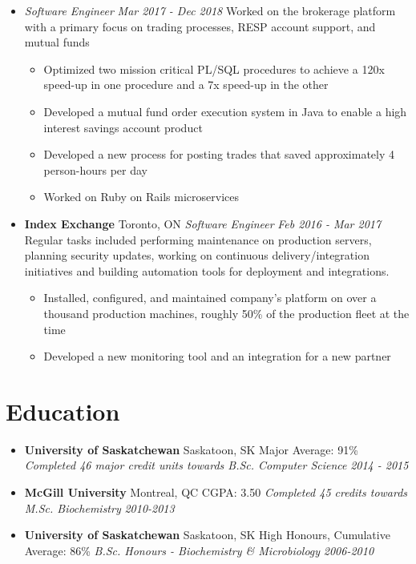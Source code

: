 \documentclass[letterpaper,11pt]{article}
\newcommand{\resumeSubHeading}[4]{
  \item[]
      \textbf{#1} \hfill #2 \newline
      \textit{#3} \hfill \textit{#4}
}
\newcommand{\jobAtSamePlace}[2]{
  \item[]
      \textit{#1} \hfill \textit{#2}
}
\newcommand{\resumeSubHeadingEducation}[5]{
  \item[]
      \textbf{#1} \hfill #2 \newline
      #3 \newline
      \textit{#4} \hfill \textit{#5}
}
\begin{document}
\begin{itemize}[leftmargin=*]
    {Engineering Team Lead}{Dec 2018 - Apr 2019}\newline
    Led a full stack team of 4 engineers in the Wealthsimple For Advisors organization
      \begin{itemize}[noitemsep,topsep=0pt]
        \item Developed new mutual fund process automation in PL/SQL and Java
      \end{itemize}
      \jobAtSamePlace
      {Software Engineer}{Mar 2017 - Dec 2018}\newline
      Worked on the brokerage platform with a primary focus on trading processes, RESP account support, and mutual funds
      \begin{itemize}[noitemsep,topsep=0pt]
        \item Optimized two mission critical PL/SQL procedures to achieve a 120x speed-up in one procedure and a 7x speed-up in the other
        \item Developed a mutual fund order execution system in Java to enable a high interest savings account product
        \item Developed a new process for posting trades that saved approximately 4 person-hours per day
        \item Worked on Ruby on Rails microservices
      \end{itemize}
      
  \resumeSubHeading
      {Index Exchange}{Toronto, ON}
      {Software Engineer}{Feb 2016 - Mar 2017}\newline
      Regular tasks included performing maintenance on production servers, planning security updates, working on continuous delivery/integration initiatives and building automation tools for deployment and integrations.
      \begin{itemize}[noitemsep,topsep=0pt]
        \item Installed, configured, and maintained company's platform on over a thousand production machines, roughly 50\% of the production fleet at the time
        \item Developed a new monitoring tool and an integration for a new partner
      \end{itemize}    
\end{itemize}

\section{Education}
  \begin{itemize}[leftmargin=*]
      \resumeSubHeadingEducation
        {University of Saskatchewan}{Saskatoon, SK}
        {Major Average: 91\%}
        {Completed 46 major credit units towards B.Sc. Computer Science}{2014 - 2015}
      \resumeSubHeadingEducation
        {McGill University}{Montreal, QC}
        {CGPA: 3.50}
        {Completed 45 credits towards M.Sc. Biochemistry}{2010-2013}
      \resumeSubHeadingEducation
        {University of Saskatchewan}{Saskatoon, SK}
        {High Honours, Cumulative Average: 86\%}
        {B.Sc. Honours - Biochemistry \& Microbiology}{2006-2010}
     \end{itemize}
\end{document}
